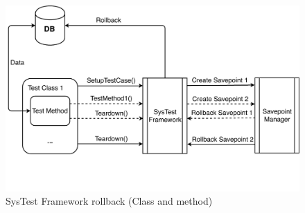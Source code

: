 \begin{figure}[ht]
	\centering
	\includegraphics[scale=0.6]{Images/SysTestRollback.pdf}
	\caption{SysTest Framework rollback (Class and method)}
	\label{fig:SysTestRollback}
\end{figure}
